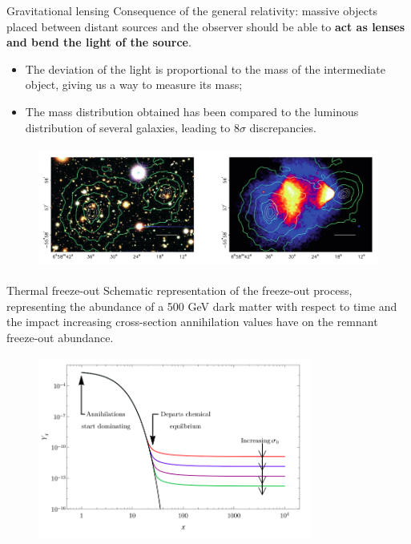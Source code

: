 \documentclass[8pt]{beamer}
\begin{document}
\begin{frame}{Gravitational lensing}
\justifying
\vspace{5pt}
Consequence of the \alert{general relativity}: massive objects placed between distant sources and the observer should be able to \textbf{act as lenses and bend the light of the source}. \vfill

\begin{itemize}
\justifying
\item The deviation of the light is proportional to the mass of the intermediate object, giving us a way to measure its mass;
\item The mass distribution obtained has been compared to the luminous distribution of several galaxies, leading to $8\sigma$ discrepancies. %
\end{itemize} \vfill

\vspace{-5pt}
\begin{figure}[htbp]
\begin{center}
\includegraphics[width=11	cm, height=4cm]{figs/BulletCluster.png}
\end{center}
\end{figure} \vfill
\end{frame}

\begin{frame}{Thermal freeze-out}
\justifying
\vspace{5pt}
Schematic representation of the \alert{freeze-out process}, representing the abundance of a
500 GeV dark matter with respect to time and the impact increasing cross-section annihilation values have on the remnant freeze-out abundance. \vfill

\begin{figure}[htbp]
\begin{center}
\includegraphics[width=9cm, height=6cm]{figs/FreezeOut.png}
\end{center}
\end{figure} \vfill
\end{frame}
\end{document}

